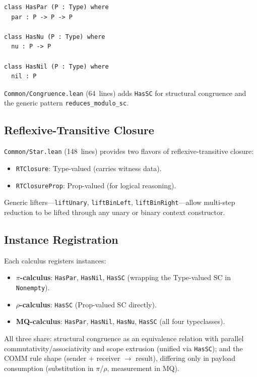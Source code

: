 \documentclass[11pt]{article}
\theoremstyle{definition}
\theoremstyle{remark}
\begin{document}
\begin{lstlisting}[caption={Shared process algebra typeclasses}]
class HasPar (P : Type) where
  par : P -> P -> P

class HasNu (P : Type) where
  nu : P -> P

class HasNil (P : Type) where
  nil : P
\end{lstlisting}

\noindent
\texttt{Common/Congruence.lean} (64~lines) adds \texttt{HasSC} for
structural congruence and the generic pattern
\texttt{reduces\_modulo\_sc}.

\subsection{Reflexive-Transitive Closure}

\texttt{Common/Star.lean} (148~lines) provides two flavors of
reflexive-transitive closure:
\begin{itemize}[leftmargin=1.5em]
  \item \texttt{RTClosure}: Type-valued (carries witness data).
  \item \texttt{RTClosureProp}: Prop-valued (for logical reasoning).
\end{itemize}
Generic lifters---\texttt{liftUnary}, \texttt{liftBinLeft},
\texttt{liftBinRight}---allow multi-step reduction to be lifted
through any unary or binary context constructor.

\subsection{Instance Registration}

Each calculus registers instances:
\begin{itemize}[leftmargin=1.5em]
  \item \textbf{$\pi$-calculus}: \texttt{HasPar}, \texttt{HasNil},
    \texttt{HasSC} (wrapping the Type-valued SC in \texttt{Nonempty}).
  \item \textbf{$\rho$-calculus}: \texttt{HasSC} (Prop-valued SC
    directly).
  \item \textbf{MQ-calculus}: \texttt{HasPar}, \texttt{HasNil},
    \texttt{HasNu}, \texttt{HasSC} (all four typeclasses).
\end{itemize}

\noindent
All three share: structural congruence as an equivalence relation with
parallel commutativity/associativity and scope extrusion (unified via
\texttt{HasSC}); and the COMM rule shape (sender + receiver $\to$
result), differing only in payload consumption (substitution in
$\pi$/$\rho$, measurement in MQ).
\end{document}
